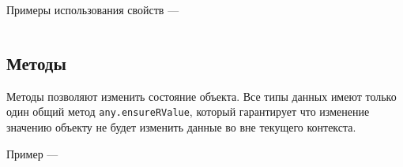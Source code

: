\noindent Примеры использования свойств —
\inputminted[linenos]{icl}{../sources/propertiesmain.icL}

\subsection{Методы}

Методы позволяют изменить состояние объекта. Все типы данных имеют только один общий метод \texttt{any.ensureRValue}, который гарантирует что изменение значению объекту не будет изменить данные во вне текущего контекста.

\noindent Пример —
\inputminted[linenos]{icl}{../sources/anyensureRValue.icL}

